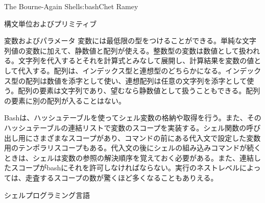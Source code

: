 \begin{aosachapter}{The Bourne-Again Shell}{s:bash}{Chet Ramey}
\begin{aosasect1}{構文単位およびプリミティブ}
\begin{aosasect2}{変数およびパラメータ}
変数には最低限の型をつけることができる。単純な文字列値の変数に加えて、静数値と配列が使える。整数型の変数は数値として扱われる。文字列を代入するとそれを計算式とみなして展開し、計算結果を変数の値として代入する。配列は、インデックス型と連想型のどちらかになる。インデックス型の配列は数値を添字として使い、連想配列は任意の文字列を添字として使う。配列の要素は文字列であり、望むなら静数値として扱うこともできる。配列の要素に別の配列が入ることはない。

Bashは、ハッシュテーブルを使ってシェル変数の格納や取得を行う。また、そのハッシュテーブルの連結リストで変数のスコープを実装する。シェル関数の呼び出し用にさまざまなスコープがあり、コマンドの前にある代入文で設定した変数用のテンポラリスコープもある。代入文の後にシェルの組み込みコマンドが続くときは、シェルは変数の参照の解決順序を覚えておく必要がある。また、連結したスコープがbashにそれを許可しなければならない。実行のネストレベルによっては、走査するスコープの数が驚くほど多くなることもありえる。

\end{aosasect2}

\begin{aosasect2}{シェルプログラミング言語}


\end{aosasect2}
\end{aosasect1}
\end{aosachapter}
